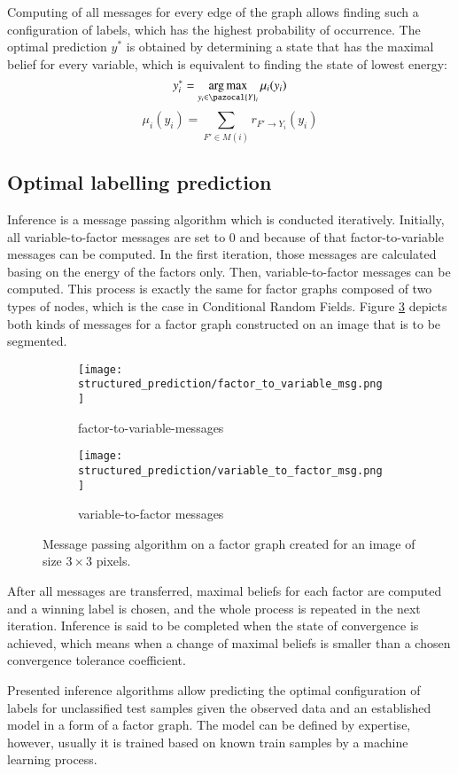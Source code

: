 Computing of all messages for every edge of the graph allows finding such a configuration of labels, which has the highest probability of occurrence. The optimal prediction $y^*$ is obtained by determining a state that has the maximal belief for every variable, which is equivalent to finding the state of lowest energy:
\begin{equation}
   y_{i}^{*} = \argmax_{y_i \in \pazocal{Y}_i}{\mu_i (y_i)}
\end{equation}
\begin{equation}
   \mu_i (y_i) = \sum_{F' \in M(i)}{ r_{F' \rightarrow Y_i}(y_i)}
\end{equation}

\subsection{Optimal labelling prediction}

Inference is a message passing algorithm which is conducted iteratively. Initially, all variable-to-factor messages are set to 0 and because of that factor-to-variable messages can be computed. In the first iteration, those messages are calculated basing on the energy of the factors only. Then, variable-to-factor messages can be computed. This process is exactly the same for factor graphs composed of two types of nodes, which is the case in Conditional Random Fields. Figure \ref{fig:inference_msgs} depicts both kinds of messages for a factor graph constructed on an image that is to be segmented.
\begin{figure}[ht]
 \centering
   \begin{subfigure}[h]{0.40\textwidth}
    \texttt{[image: structured\_prediction/factor\_to\_variable\_msg.png]}
    \caption{factor-to-variable-messages}
    \label{fig:factor_variable_msg}
  \end{subfigure}
  \begin{subfigure}[h]{0.40\textwidth}
    \texttt{[image: structured\_prediction/variable\_to\_factor\_msg.png]}
    \caption{variable-to-factor messages}
    \label{fig:variable_factor_msg}
  \end{subfigure}
    \caption{Message passing algorithm on a factor graph created for an image of size $3\times 3$ pixels.}
    \label{fig:inference_msgs}
\end{figure}
After all messages are transferred, maximal beliefs for each factor are computed and a winning label is chosen, and the whole process is repeated in the next iteration. Inference is said to be completed when the state of convergence is achieved, which means when a change of maximal beliefs is smaller than a chosen convergence tolerance coefficient.

\newpage
Presented inference algorithms allow predicting the optimal configuration of labels for unclassified test samples given the observed data and an established model in a form of a factor graph. The model can be defined by expertise, however, usually it is trained based on known train samples by a machine learning process.